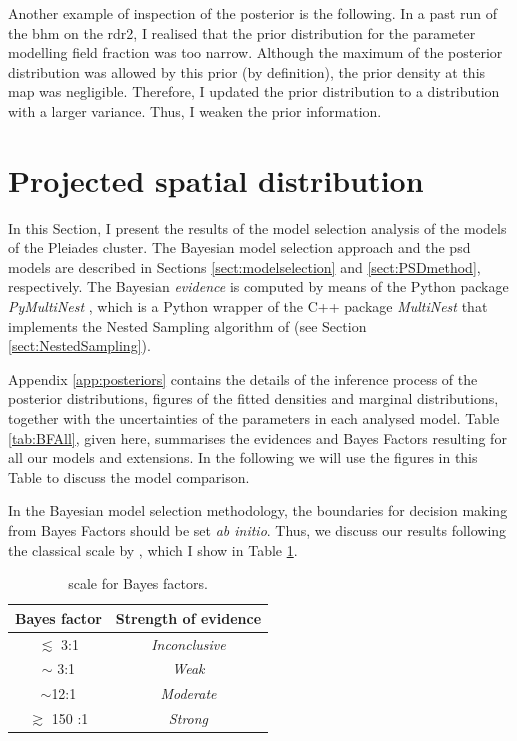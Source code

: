 Another example of inspection of the posterior is the following. In a past run of the \gls{bhm} on the \gls{rdr2}, I realised that the prior distribution for the parameter modelling field fraction was too narrow. Although the maximum of the posterior distribution was allowed by this prior (by definition), the prior density at this \gls{map} was negligible. Therefore, I updated the prior distribution to a distribution with a larger variance. Thus, I weaken the prior information.

\section{Projected spatial distribution}
\label{sect:PSDresults}
In this Section, I present the results of the model selection analysis of the  models of the Pleiades cluster. The Bayesian model selection approach and the \gls{psd} models are described in Sections \ref{sect:modelselection} and \ref{sect:PSDmethod}, respectively. The Bayesian \emph{evidence} is computed by means of the Python package \emph{PyMultiNest} \citep{Buchner2014}, which is a Python wrapper of the C++ package \emph{MultiNest} \citep{Feroz2009} that implements the Nested Sampling algorithm of \citet{Skilling2004,Skilling2006} (see Section \ref{sect:NestedSampling}).

Appendix \ref{app:posteriors} contains the details of the inference process 
of the posterior distributions, figures of the fitted densities and marginal distributions, 
together with the uncertainties of the parameters in each analysed model.
Table \ref{tab:BFAll}, given here, summarises the evidences and Bayes Factors
resulting for all our models and extensions. In the following we will use the figures in this Table to discuss the model comparison.


In the Bayesian model selection methodology, the boundaries for decision making from Bayes Factors should be set \emph{ab initio}. Thus, we discuss our results following the classical scale by \cite{Jeffreys61}, which I show in Table \ref{tab:JeffreysScale}.

\begin{table}[H]
\caption{\citet{Jeffreys61} scale for Bayes factors.}
\begin{center}
\begin{tabular}{cc}
Bayes factor & Strength of evidence\\
\hline
$\lesssim$ 3:1 & \emph{Inconclusive}\\
$\sim$ 3:1 & \emph{Weak}\\
$\sim$12:1 & \emph{Moderate}\\
$\gtrsim$ 150 :1 & \emph{Strong}\\
\hline
\end{tabular}
\end{center}
\label{tab:JeffreysScale}
\end{table}%
 

